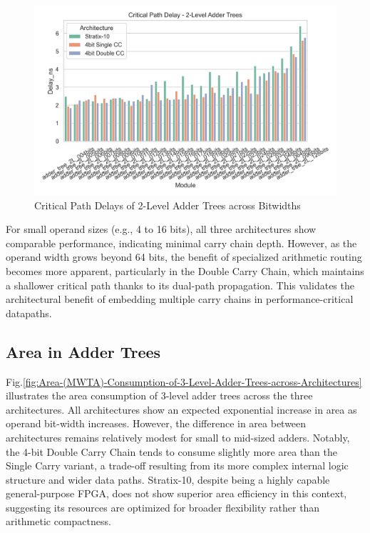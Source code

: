 \begin{figure}
	\centerline{\includegraphics[scale = 0.75]{Figures/adder_trees_2lvl_delay_bar_plt.png}}
	\caption{Critical Path Delays of 2-Level Adder Trees across Bitwidths}
	\label{fig:critical-path-delays-of-2-level-adder-trees-across-bitwidhts}
\end{figure}

For small operand sizes (e.g., 4 to 16 bits), all three architectures show comparable performance, indicating minimal carry chain depth. However, as the operand width grows beyond 64 bits, the benefit of specialized arithmetic routing becomes more apparent, particularly in the Double Carry Chain, which maintains a shallower critical path thanks to its dual-path propagation. This validates the architectural benefit of embedding multiple carry chains in performance-critical datapaths.

\subsection{Area in Adder Trees}
Fig.\ref{fig:Area-(MWTA)-Consumption-of-3-Level-Adder-Trees-across-Architectures} illustrates the area consumption of 3-level adder trees across the three architectures. All architectures show an expected exponential increase in area as operand bit-width increases. However, the difference in area between architectures remains relatively modest for small to mid-sized adders. Notably, the 4-bit Double Carry Chain tends to consume slightly more area than the Single Carry variant, a trade-off resulting from its more complex internal logic structure and wider data paths. Stratix-10, despite being a highly capable general-purpose FPGA, does not show superior area efficiency in this context, suggesting its resources are optimized for broader flexibility rather than arithmetic compactness.

